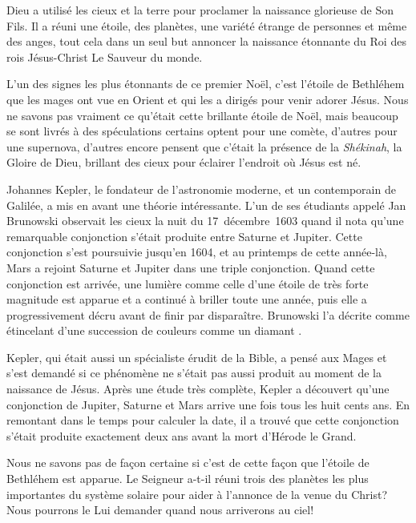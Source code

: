 


Dieu a utilisé les cieux et la terre pour proclamer la naissance glorieuse de Son Fils. Il a réuni une étoile, des planètes, une variété étrange de personnes et même des anges, tout cela dans un seul but\frcolon{} annoncer la naissance étonnante du Roi des rois \ocadr Jésus-Christ \fcadr{} Le Sauveur du monde.

L'un des signes les plus étonnants de ce premier Noël, c'est l'étoile de Bethléhem que les mages ont vue en Orient et qui les a dirigés pour venir adorer Jésus. Nous ne savons pas vraiment ce qu'était cette brillante étoile de Noël, mais beaucoup se sont livrés à des spéculations\frcolon{} certains optent pour une comète, d'autres pour une supernova, d'autres encore pensent que c'était la présence de la \emph{Shékinah}, la Gloire de Dieu, brillant des cieux pour éclairer l'endroit où Jésus est né.

Johannes Kepler, le fondateur de l'astronomie moderne, et un contemporain de Galilée, a mis en avant une théorie intéressante. L'un de ses étudiants appelé Jan Brunowski observait les cieux la nuit du 17~décembre~1603 quand il nota qu'une remarquable conjonction s'était produite entre Saturne et Jupiter. Cette conjonction s'est poursuivie jusqu'en 1604, et au printemps de cette année-là, Mars a rejoint Saturne et Jupiter dans une triple conjonction. Quand cette conjonction est arrivée, une lumière comme celle d'une étoile de très forte magnitude est apparue et a continué à briller toute une année, puis elle a progressivement décru avant de finir par disparaître. Brunowski l'a décrite comme \Og étincelant d'une succession de couleurs comme un diamant \Fg{}.

Kepler, qui était aussi un spécialiste érudit de la Bible, a pensé aux Mages et s'est demandé si ce phénomène ne s'était pas aussi produit au moment de la naissance de Jésus. Après une étude très complète, Kepler a découvert qu'une conjonction de Jupiter, Saturne et Mars arrive une fois tous les huit cents ans. En remontant dans le temps pour calculer la date, il a trouvé que cette conjonction s'était produite exactement deux ans avant la mort d'Hérode le Grand.

Nous ne savons pas de façon certaine si c'est de cette façon que l'étoile de Bethléhem est apparue. Le Seigneur a-t-il réuni trois des planètes les plus importantes du système solaire pour aider à l'annonce de la venue du Christ? Nous pourrons le Lui demander quand nous arriverons au ciel!



